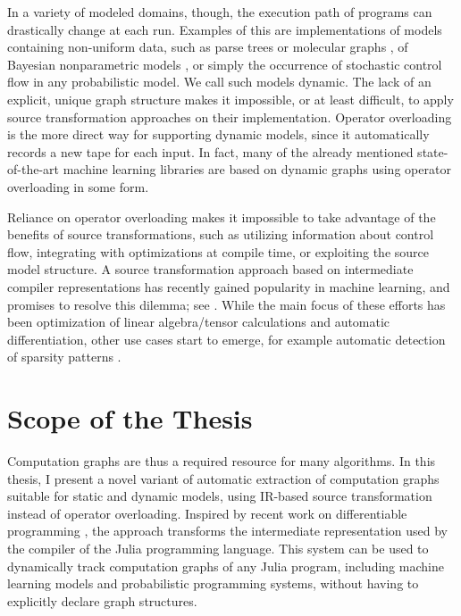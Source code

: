 In a variety of modeled domains, though, the execution path of programs can drastically change at
each run.  Examples of this are implementations of models containing non-uniform data, such as parse
trees \parencite{socher2011parsing} or molecular graphs \parencite{bianucci2000application}, of
Bayesian nonparametric models \parencite{hjort2010bayesian}, or simply the occurrence of stochastic
control flow in any probabilistic model.  We call such models dynamic.  The lack of an explicit,
unique graph structure makes it impossible, or at least difficult, to apply source transformation
approaches on their implementation.  Operator overloading is the more direct way for supporting
dynamic models, since it automatically records a new tape for each input. In fact, many of the
already mentioned state-of-the-art machine learning libraries are based on dynamic graphs using
operator overloading in some form.

Reliance on operator overloading makes it impossible to take advantage of the benefits of source
transformations, such as utilizing information about control flow, integrating with optimizations at
compile time, or exploiting the source model structure.  A source transformation approach based on
intermediate compiler representations has recently gained popularity in machine learning, and
promises to resolve this dilemma; see \textcite{bradbury2018jax,lattner2020mlir}.  While the main
focus of these efforts has been optimization of linear algebra/tensor calculations and automatic
differentiation, other use cases start to emerge, for example automatic detection of sparsity
patterns \parencite{gowda2019sparsity}.

\section{Scope of the Thesis}
\label{sec:scope}

Computation graphs are thus a required resource for many algorithms.  In this thesis, I present a
novel variant of automatic extraction of computation graphs suitable for static and dynamic models,
using IR-based source transformation instead of operator overloading.  Inspired by recent work on
differentiable programming \parencite{innes2018don}, the approach transforms the intermediate
representation used by the compiler of the Julia programming language.  This system can be used to
dynamically track computation graphs of any Julia program, including machine learning models and
probabilistic programming systems, without having to explicitly declare graph structures.

